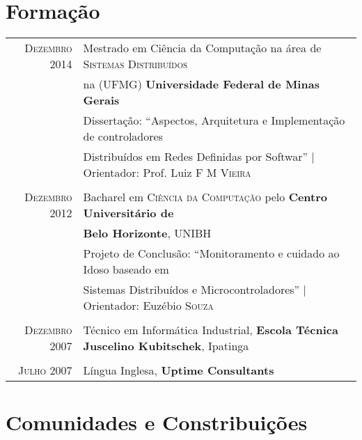 \documentclass[a4paper,10pt]{article} %
\begin{document}
\section{Formação}

\begin{tabular}{rl}
\textsc{Dezembro} 2014 & Mestrado em Ciência da Computação na área de
\textsc{Sistemas Distribuídos}
\\ & na (UFMG)
\textbf{Universidade Federal de Minas Gerais} \\
& Dissertação: ``Aspectos, Arquitetura e Implementação de controladores
\\ & Distribuídos em Redes Definidas por Softwar''
| \small Orientador: Prof. Luiz \textsc{F M Vieira} \\
&\\


\textsc{Dezembro} 2012& Bacharel em \textsc{Ciência da Computação}
pelo \normalsize\textbf{Centro Universitário de}
\\ & \textbf{Belo Horizonte}, UNIBH \\
& Projeto de Conclusão: ``Monitoramento e cuidado ao Idoso baseado em
\\ & Sistemas Distribuídos e Microcontroladores''
| \small Orientador: Euzébio \textsc{Souza} \\
&\\


\textsc{Dezembro} 2007 & Técnico em Informática Industrial,
\textbf{Escola Técnica Juscelino Kubitschek}, Ipatinga \\
&\\


\textsc{Julho} 2007 & Língua Inglesa, \textbf{Uptime Consultants}
\end{tabular}





\section{Comunidades e Constribuições}
\end{document}
